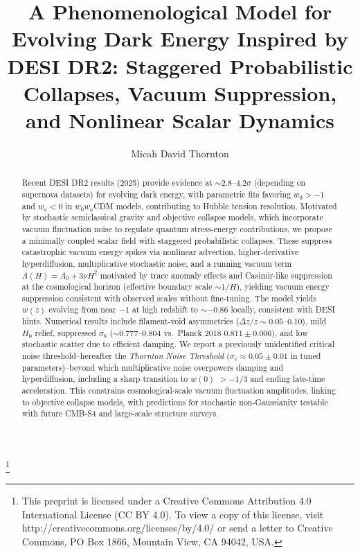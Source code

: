 \documentclass[preprint]{aastex7}
\begin{document}
\title{A Phenomenological Model for Evolving Dark Energy Inspired by DESI DR2: Staggered Probabilistic Collapses, Vacuum Suppression, and Nonlinear Scalar Dynamics}

\author[0009-0001-9080-8200]{Micah David Thornton}
\footnote{This preprint is licensed under a Creative Commons Attribution 4.0 International License (CC BY 4.0). To view a copy of this license, visit http://creativecommons.org/licenses/by/4.0/ or send a letter to Creative Commons, PO Box 1866, Mountain View, CA 94042, USA.}

\begin{abstract}
Recent DESI DR2 results (2025) provide evidence at $\sim$2.8--4.2\( \sigma \) (depending on supernova datasets) for evolving dark energy, with parametric fits favoring \( w_0 > -1 \) and \( w_a < 0 \) in $w_0 w_a$CDM models, contributing to Hubble tension resolution.
Motivated by stochastic semiclassical gravity and objective collapse models, which incorporate vacuum fluctuation noise to regulate quantum stress-energy contributions, we propose a minimally coupled scalar field with staggered probabilistic collapses. These suppress catastrophic vacuum energy spikes via nonlinear advection, higher-derivative hyperdiffusion, multiplicative stochastic noise, and a running vacuum term \( \Lambda(H) = \Lambda_0 + 3\nu H^2 \) motivated by trace anomaly effects and Casimir-like suppression at the cosmological horizon (effective boundary scale \( \sim 1/H \)), yielding vacuum energy suppression consistent with observed scales without fine-tuning. The model yields \( w(z) \) evolving from near \( -1 \) at high redshift to \( \sim-0.86 \) locally, consistent with DESI hints. Numerical results include filament-void asymmetries (\( \Delta z/z \sim0.05 \)--0.10), mild \( H_0 \) relief, suppressed \( \sigma_8 \) ($\sim$0.777--0.804 vs.\ Planck 2018 $0.811 \pm 0.006$), and low stochastic scatter due to efficient damping.
We report a previously unidentified critical noise threshold--hereafter the \textit{Thornton Noise Threshold} (\( \sigma_c \approx 0.05 \pm 0.01 \) in tuned parameters)--beyond which multiplicative noise overpowers damping and hyperdiffusion, including a sharp transition to \( w(0) \) \( >-1/3 \) and ending late-time acceleration. This constrains cosmological-scale vacuum fluctuation amplitudes, linking to objective collapse models, with predictions for stochastic non-Gaussianity testable with future CMB-S4 and large-scale structure surveys.
\end{abstract}
\end{document}
